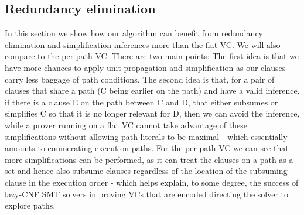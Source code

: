 \subsection{Redundancy elimination}
In this section we show how our algorithm can benefit from redundancy elimination and simplification inferences more than the flat VC.
We will also compare to the per-path VC. 
There are two main points:
The first idea is that we have more chances to apply unit propagation and simplification as our clauses carry less baggage of path conditions.
The second idea is that, for a pair of clauses  that share a path (C being earlier on the path) and have a valid inference, 
if there is a clause E on the path between C and D, that either subsumes or simplifies C so that it is no longer relevant for D, then we can avoid the inference, while a prover running on a flat VC cannot take advantage of these simplifications without allowing path literals to be maximal - which essentially amounts to enumerating execution paths. For the per-path VC we can see that more simplifications can be performed, as it can treat the clauses on a path as a set and hence also subsume clauses regardless of the location of the subsuming clause in the execution order - which helps explain, to some degree, the success of lazy-CNF SMT solvers in proving VCs that are encoded directing the solver to explore paths.

